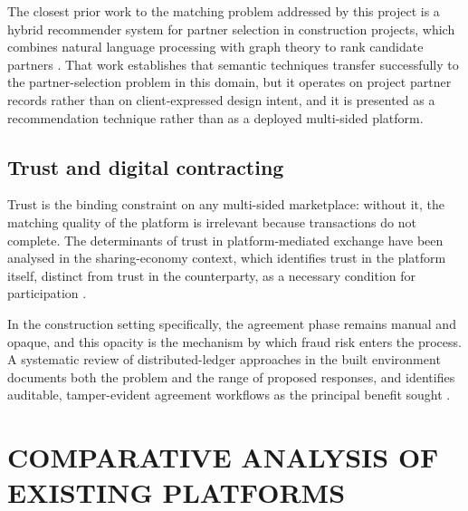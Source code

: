 The closest prior work to the matching problem addressed by this project
is a hybrid recommender system for partner selection in construction
projects, which combines natural language processing with graph theory
to rank candidate partners \cite{zhang2021hybrid}. That work
establishes that semantic techniques transfer successfully to the
partner-selection problem in this domain, but it operates on project
partner records rather than on client-expressed design intent, and it
is presented as a recommendation technique rather than as a deployed
multi-sided platform.


\subsection{Trust and digital contracting}
\label{subsec:lit-trust}


Trust is the binding constraint on any multi-sided marketplace: without
it, the matching quality of the platform is irrelevant because
transactions do not complete. The determinants of trust in
platform-mediated exchange have been analysed in the sharing-economy
context, which identifies trust in the platform itself, distinct from
trust in the counterparty, as a necessary condition for participation
\cite{hawlitschek2016trust}.

In the construction setting specifically, the agreement phase remains
manual and opaque, and this opacity is the mechanism by which fraud
risk enters the process. A systematic review of distributed-ledger
approaches in the built environment documents both the problem and the
range of proposed responses, and identifies auditable, tamper-evident
agreement workflows as the principal benefit sought
\cite{li2019blockchain}.


\section{COMPARATIVE ANALYSIS OF EXISTING PLATFORMS}
\label{sec:lit-comparison}

